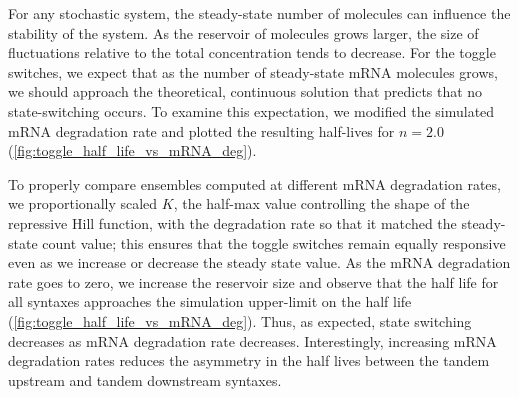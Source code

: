 \documentclass[11pt]{article}
\begin{document}
For any stochastic system, the steady-state number of molecules can influence the stability of the system. As the reservoir of molecules grows larger, the size of fluctuations relative to the total concentration tends to decrease. For the toggle switches, we expect that as the number of steady-state mRNA molecules grows, we should approach the theoretical, continuous solution that predicts that no state-switching occurs. To examine this expectation, we modified the simulated mRNA degradation rate and plotted the resulting half-lives for \(n = 2.0\) (\cref{fig:toggle_half_life_vs_mRNA_deg}).

To properly compare ensembles computed at different mRNA degradation rates, we proportionally scaled \(K\), the half-max value controlling the shape of the repressive Hill function, with the degradation rate so that it matched the steady-state count value; this ensures that the toggle switches remain equally responsive even as we increase or decrease the steady state value. As the mRNA degradation rate goes to zero, we increase the reservoir size and observe that the half life for all syntaxes approaches the simulation upper-limit on the half life (\cref{fig:toggle_half_life_vs_mRNA_deg}). Thus, as expected, state switching decreases as mRNA degradation rate decreases. Interestingly, increasing mRNA degradation rates reduces the asymmetry in the half lives between the tandem upstream and tandem downstream syntaxes.
\end{document}
